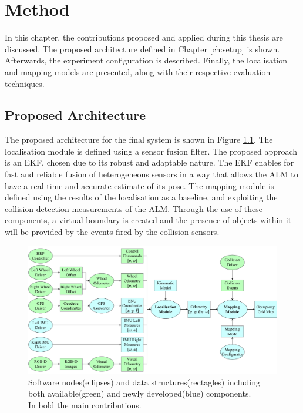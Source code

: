 \chapter{Method}
\label{ch:methods}

\noindent In this chapter, the contributions proposed and applied during this thesis are discussed.
The proposed architecture defined in Chapter \ref{ch:setup} is shown.
Afterwards, the experiment configuration is described.%
Finally, the localisation and mapping models are presented, along with their respective evaluation techniques.

\section{Proposed Architecture} 
\label{ch:prop-architecture}
\noindent The proposed architecture for the final system is shown in Figure \ref{fig:arch-structure}. 
The localisation module is defined using a sensor fusion filter.
The proposed approach is an \gls{EKF}, chosen due to its robust and adaptable nature.
The \gls{EKF} enables for fast and reliable fusion of heterogeneous sensors in a way that allows the \gls{ALM} to have a real-time and accurate estimate of its pose.
The mapping module is defined using the results of the localisation as a baseline, and exploiting the collision detection measurements of the \gls{ALM}.
Through the use of these components, a virtual boundary is created and the presence of objects within it will be provided by the events fired by the collision sensors.
\begin{figure}[H]
	\begin{center}
	\centering
		\includegraphics[width=1\textwidth]{Images/3-0-SetUp/SWSetUp.pdf}
		\caption{Software nodes(ellipses) and data structures(rectagles) including\\
		both available(green) and newly developed(blue) components.\\
		In bold the main contributions.\centering }
		\label{fig:arch-structure}
	\end{center}
\end{figure}
